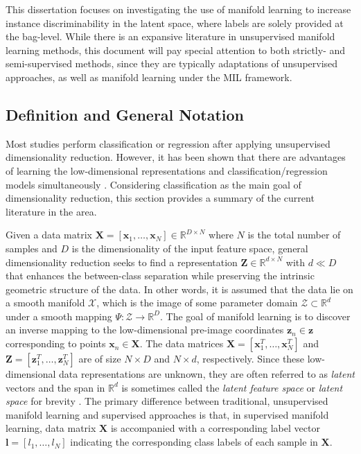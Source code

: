 This dissertation focuses on investigating the use of manifold learning to increase instance discriminability in the latent space, where labels are solely provided at the bag-level.   While there is an expansive literature in unsupervised manifold learning methods, this document will pay special attention to both strictly- and semi-supervised methods, since they are typically adaptations of unsupervised approaches, as well as manifold learning under the MIL framework.

\subsection{Definition and General Notation}
Most studies perform classification or regression after applying unsupervised dimensionality reduction.  However, it has been shown that there are advantages of learning the low-dimensional representations and classification/regression models simultaneously \citep{Chao2019RecentAdvancesSupervisedDimRed,Rish2008SupDimRedGLM}.  Considering classification as the main goal of dimensionality reduction, this section provides a summary of the current literature in the area. \newline

Given a data matrix $\bm{X} = [\bm{x}_1, \dots, \bm{x}_N]\in \mathbb{R}^{D \times N}$ where $N$ is the total number of samples and $D$ is the dimensionality of the input feature space, general dimensionality reduction seeks to find a representation $\bm{Z} \in \mathbb{R}^{d \times N}$ with $d \ll D$ that enhances the between-class separation while preserving the intrinsic geometric structure of the data\citep{Vural2018StudySupervisedManifoldLearning}.  In other words, it is assumed that the data lie on a smooth manifold $\mathcal{X}$, which is the image of some parameter domain $\mathcal{Z} \subset \mathbb{R}^{d}$ under a smooth mapping $\Psi : \mathcal{Z} \rightarrow \mathbb{R}^{D}$.  The goal of manifold learning is to discover an inverse mapping to the low-dimensional pre-image coordinates $\bm{z}_n \in \bm{z}$ corresponding to points $\bm{x}_n \in \bm{X}$.  The data matrices $\bm{X} = [\bm{x}^{T}_{1}, \dots, \bm{x}^{T}_{N}]$ and $\bm{Z} = [\bm{z}^{T}_{1}, \dots, \bm{z}^{T}_{N}]$ are of size $N \times D$ and $N \times d$, respectively.  Since these low-dimensional data representations are unknown, they are often referred to as \textit{latent} vectors and the span in $\mathbb{R}^d$ is sometimes called the \textit{latent feature space} or \textit{latent space} for brevity \citep{Murphy2012}. The primary difference between traditional, unsupervised manifold learning and supervised approaches is that, in supervised manifold learning, data matrix $\bm{X} $ is accompanied with a corresponding label vector $\bm{l} = [l_1, \dots, l_N]$ indicating the corresponding class labels of each sample in $\bm{X}$. \newline

